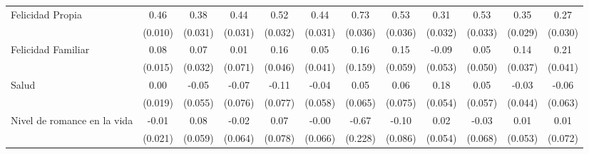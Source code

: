 \documentclass[12pt,spanish]{article}
\begin{document}
\begin{table}[H]
{{\begin{tabular}{l*{11}{c}}
        \hline
        Felicidad Propia   &     0.46\sym{***}&     0.38\sym{***}&     0.44\sym{***}&     0.52\sym{***}&     0.44\sym{***}&     0.73\sym{***}&     0.53\sym{***}&     0.31\sym{***}&     0.53\sym{***}&     0.35\sym{***}&     0.27\sym{***}\\
        
        &  (0.010)         &  (0.031)         &  (0.031)         &  (0.032)         &  (0.031)         &  (0.036)         &  (0.036)         &  (0.032)         &  (0.033)         &  (0.029)         &  (0.030)         \\
        [1em]
        
        Felicidad Familiar&     0.08\sym{***}&     0.07\sym{*}  &     0.01         &     0.16\sym{***}&     0.05         &     0.16         &     0.15\sym{*}  &    -0.09         &     0.05         &     0.14\sym{***}&     0.21\sym{***}\\
        
        &  (0.015)         &  (0.032)         &  (0.071)         &  (0.046)         &  (0.041)         &  (0.159)         &  (0.059)         &  (0.053)         &  (0.050)         &  (0.037)         &  (0.041)         \\
        [1em]
        
        Salud          &     0.00         &    -0.05         &    -0.07         &    -0.11         &    -0.04         &     0.05         &     0.06         &     0.18\sym{***}&     0.05         &    -0.03         &    -0.06         \\
        
        &  (0.019)         &  (0.055)         &  (0.076)         &  (0.077)         &  (0.058)         &  (0.065)         &  (0.075)         &  (0.054)         &  (0.057)         &  (0.044)         &  (0.063)         \\
        [1em]
        
        Nivel de romance en la vida&    -0.01         &     0.08         &    -0.02         &     0.07         &    -0.00         &    -0.67\sym{**} &    -0.10         &     0.02         &    -0.03         &     0.01         &     0.01         \\
        
        &  (0.021)         &  (0.059)         &  (0.064)         &  (0.078)         &  (0.066)         &  (0.228)         &  (0.086)         &  (0.054)         &  (0.068)         &  (0.053)         &  (0.072)         \\
        [1em]


\end{tabular}}}
\end{table}
\end{document}
